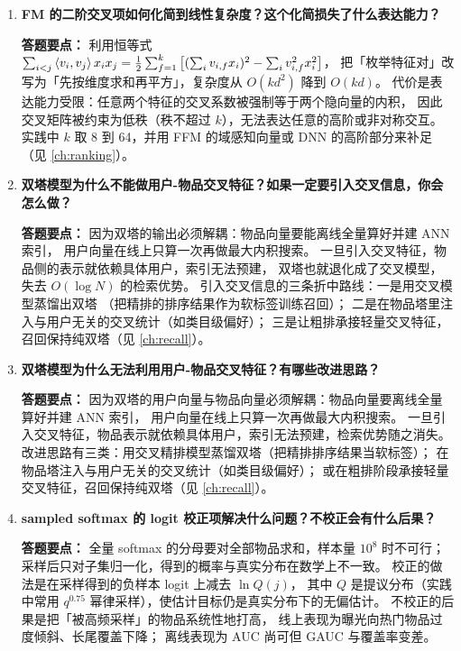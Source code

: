 \begin{interview}[题库与答题要点]
\begin{enumerate}[label=]
  \item[\textcolor{VioletDeep}{\textbf{Q8.}}] \textbf{FM 的二阶交叉项如何化简到线性复杂度？这个化简损失了什么表达能力？}
\par\smallskip\noindent\textcolor{VioletDeep}{\textbf{答题要点：}}
利用恒等式 $\sum_{i<j}\left\langle v_i, v_j \right\rangle x_ix_j
  = \frac{1}{2}\sum_{f=1}^{k}\big[(\sum_i v_{i,f}x_i)^2 - \sum_i v_{i,f}^2x_i^2\big]$，
把「枚举特征对」改写为「先按维度求和再平方」，复杂度从 $O(kd^2)$ 降到 $O(kd)$。
代价是表达能力受限：任意两个特征的交叉系数被强制等于两个隐向量的内积，
因此交叉矩阵被约束为低秩（秩不超过 $k$），无法表达任意的高阶或非对称交互。
实践中 $k$ 取 8 到 64，并用 FFM 的域感知向量或 DNN 的高阶部分来补足（见 \cref{ch:ranking}）。

  \item[\textcolor{VioletDeep}{\textbf{Q9.}}] \textbf{双塔模型为什么不能做用户-物品交叉特征？如果一定要引入交叉信息，你会怎么做？}
\par\smallskip\noindent\textcolor{VioletDeep}{\textbf{答题要点：}}
因为双塔的输出必须解耦：物品向量要能离线全量算好并建 ANN 索引，
用户向量在线上只算一次再做最大内积搜索。
一旦引入交叉特征，物品侧的表示就依赖具体用户，索引无法预建，
双塔也就退化成了交叉模型，失去 $O(\log N)$ 的检索优势。
引入交叉信息的三条折中路线：一是用交叉模型蒸馏出双塔
（把精排的排序结果作为软标签训练召回）；
二是在物品塔里注入与用户无关的交叉统计（如类目级偏好）；
三是让粗排承接轻量交叉特征，召回保持纯双塔（见 \cref{ch:recall}）。

  \item[\textcolor{VioletDeep}{\textbf{Q10.}}] \textbf{双塔模型为什么无法利用用户-物品交叉特征？有哪些改进思路？}
\par\smallskip\noindent\textcolor{VioletDeep}{\textbf{答题要点：}}
因为双塔的用户向量与物品向量必须解耦：物品向量要离线全量算好并建 ANN 索引，
用户向量在线上只算一次再做最大内积搜索。
一旦引入交叉特征，物品表示就依赖具体用户，索引无法预建，检索优势随之消失。
改进思路有三类：用交叉精排模型蒸馏双塔（把精排排序结果当软标签）；
在物品塔注入与用户无关的交叉统计（如类目级偏好）；
或在粗排阶段承接轻量交叉特征，召回保持纯双塔（见 \cref{ch:recall}）。

  \item[\textcolor{VioletDeep}{\textbf{Q11.}}] \textbf{sampled softmax 的 logit 校正项解决什么问题？不校正会有什么后果？}
\par\smallskip\noindent\textcolor{VioletDeep}{\textbf{答题要点：}}
全量 softmax 的分母要对全部物品求和，样本量 $10^8$ 时不可行；
采样后只对子集归一化，得到的概率与真实分布在数学上不一致。
校正的做法是在采样得到的负样本 logit 上减去 $\ln Q(j)$，
其中 $Q$ 是提议分布（实践中常用 $q^{0.75}$ 幂律采样），使估计目标仍是真实分布下的无偏估计。
不校正的后果是把「被高频采样」的物品系统性地打高，
线上表现为曝光向热门物品过度倾斜、长尾覆盖下降；
离线表现为 AUC 尚可但 GAUC 与覆盖率变差。


\end{enumerate}
\end{interview}

